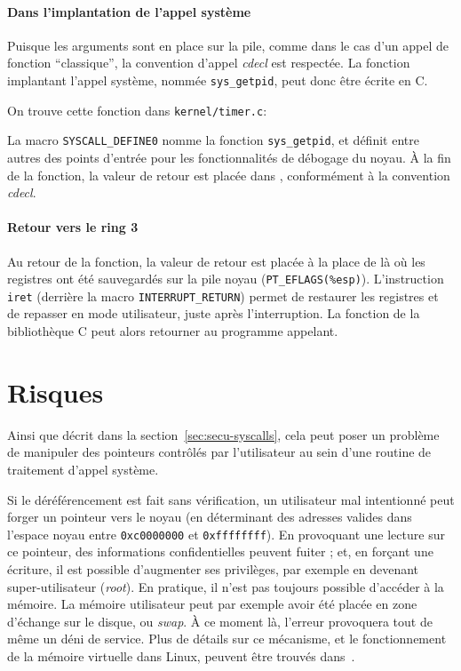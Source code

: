\paragraph{Dans l'implantation de l'appel système}

Puisque les arguments sont en place sur la pile, comme dans le cas d'un appel de
fonction \enquote{classique}, la convention d'appel \emph{cdecl} est respectée.
La fonction implantant l'appel système, nommée \texttt{sys\_getpid}, peut donc
être écrite en C.

On trouve cette fonction dans \texttt{kernel/timer.c}:


La macro \texttt{SYSCALL_DEFINE0} nomme la fonction \texttt{sys\_getpid}, et
définit entre autres des points d'entrée pour les fonctionnalités de débogage du
noyau. À la fin de la fonction, la valeur de retour est placée dans \eax,
conformément à la convention \emph{cdecl}.

\paragraph{Retour vers le ring 3}

Au retour de la fonction, la valeur de retour est placée à la place de \eax{} là
où les registres ont été sauvegardés sur la pile noyau
(\texttt{PT\_EFLAGS(\%esp)}). %
L'instruction \texttt{iret} (derrière la macro
\texttt{INTERRUPT\_RETURN}) permet de restaurer les registres et de repasser en
mode utilisateur, juste après l'interruption. La fonction de la bibliothèque C
peut alors retourner au programme appelant.

\section{Risques}

Ainsi que décrit dans la section~\ref{sec:secu-syscalls}, cela peut poser un
problème de manipuler des pointeurs contrôlés par l'utilisateur au sein d'une
routine de traitement d'appel système.

Si le déréférencement est fait sans vérification, un utilisateur mal intentionné
peut forger un pointeur vers le noyau (en déterminant des adresses valides dans
l'espace noyau entre \texttt{0xc0000000} et \texttt{0xffffffff}). En provoquant
une lecture sur ce pointeur, des informations confidentielles peuvent fuiter ;
et, en forçant une écriture, il est possible d'augmenter ses privilèges, par
exemple en devenant super-utilisateur (\emph{root}). En pratique, il n'est pas
toujours possible d'accéder à la mémoire. La mémoire utilisateur peut par
exemple avoir été placée en zone d'échange sur le disque, ou \emph{swap}. À ce
moment là, l'erreur provoquera tout de même un déni de service. Plus de détails
sur ce mécanisme, et le fonctionnement de la mémoire virtuelle dans Linux,
peuvent être trouvés dans~\cite{userspaceaccess}.

